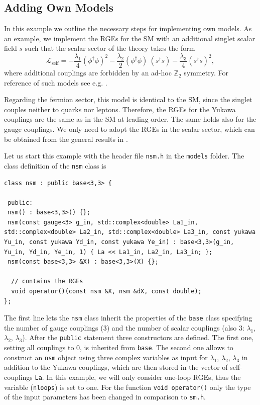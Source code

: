\documentclass[11pt,a4paper]{article}
\begin{document}
\subsection{\label{sec::adding} Adding Own Models}
In this example we outline the necessary steps for implementing own models. As an example, we implement the RGEs for the SM with an additional singlet scalar field $s$ such that the scalar sector of the theory takes the form
\begin{equation} \label{eq:nsm_la}
  \mathcal{L}_{\mathrm{self}} = -\frac{\lambda_1}{4} (\phi^\dagger\phi)^2  -\frac{\lambda_2}{2} (\phi^\dagger\phi)\ (s^\dagger s)   -\frac{\lambda_3}{4} (s^\dagger s)^2 ,
\end{equation}
where additional couplings are forbidden by an ad-hoc $\mathbb{Z}_2$ symmetry. For reference of such models see e.g. \cite{Schabinger:2005ei,Patt:2006fw,Bowen:2007ia}.

Regarding the fermion sector, this model is identical to the SM, since the singlet couples neither to quarks nor leptons. Therefore, the RGEs for the Yukawa couplings are the same as in the SM at leading order.
The same holds also for the gauge couplings. We only need to adopt the RGEs in the scalar sector, which can be obtained from the general results in \cite{Machacek:1984zw,Poole:2019kcm}.

Let us start this example with the header file \texttt{nsm.h} in the \texttt{models} folder. The class definition of the \texttt{nsm} class is
\begin{lstlisting}
class nsm : public base<3,3> {
  
 public:
 nsm() : base<3,3>() {};
 nsm(const gauge<3> g_in, std::complex<double> La1_in, std::complex<double> La2_in, std::complex<double> La3_in, const yukawa Yu_in, const yukawa Yd_in, const yukawa Ye_in) : base<3,3>(g_in, Yu_in, Yd_in, Ye_in, 1) { La << La1_in, La2_in, La3_in; };
 nsm(const base<3,3> &X) : base<3,3>(X) {};
 
  // contains the RGEs
  void operator()(const nsm &X, nsm &dX, const double);
};
\end{lstlisting}
The first line lets the \texttt{nsm} class inherit the properties of the \texttt{base} class specifying the number of gauge couplings (3) and the number of scalar couplings (also 3: $\lambda_1$, $\lambda_2$, $\lambda_3$).
After the \texttt{public} statement three constructors are defined. The first one, setting all couplings to 0, is inherited from \texttt{base}.
The second one allows to construct an \texttt{nsm} object using three complex variables as input for $\lambda_1$, $\lambda_2$, $\lambda_3$ in addition to the Yukawa couplings,
which are then stored in the vector of self-couplings \texttt{La}.
In this example, we will only consider one-loop RGEs, thus the variable (\texttt{nloops}) is set to one.
For the function \texttt{void operator()} only the type of the input parameters has been changed in comparison to \texttt{sm.h}.
\end{document}
